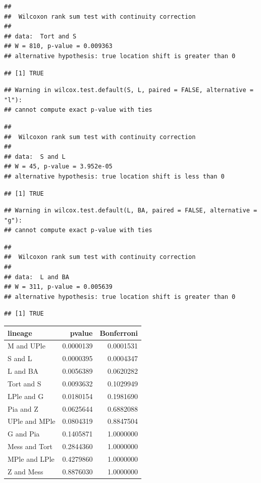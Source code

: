 \documentclass[]{article}
\begin{document}
\begin{verbatim}
## 
##  Wilcoxon rank sum test with continuity correction
## 
## data:  Tort and S
## W = 810, p-value = 0.009363
## alternative hypothesis: true location shift is greater than 0
\end{verbatim}

\begin{verbatim}
## [1] TRUE
\end{verbatim}

\begin{verbatim}
## Warning in wilcox.test.default(S, L, paired = FALSE, alternative = "l"):
## cannot compute exact p-value with ties
\end{verbatim}

\begin{verbatim}
## 
##  Wilcoxon rank sum test with continuity correction
## 
## data:  S and L
## W = 45, p-value = 3.952e-05
## alternative hypothesis: true location shift is less than 0
\end{verbatim}

\begin{verbatim}
## [1] TRUE
\end{verbatim}

\begin{verbatim}
## Warning in wilcox.test.default(L, BA, paired = FALSE, alternative = "g"):
## cannot compute exact p-value with ties
\end{verbatim}

\begin{verbatim}
## 
##  Wilcoxon rank sum test with continuity correction
## 
## data:  L and BA
## W = 311, p-value = 0.005639
## alternative hypothesis: true location shift is greater than 0
\end{verbatim}

\begin{verbatim}
## [1] TRUE
\end{verbatim}

\begin{longtable}[]{@{}lrr@{}}
\toprule
lineage & pvalue & Bonferroni\tabularnewline
\midrule
\endhead
M and UPle & 0.0000139 & 0.0001531\tabularnewline
S and L & 0.0000395 & 0.0004347\tabularnewline
L and BA & 0.0056389 & 0.0620282\tabularnewline
Tort and S & 0.0093632 & 0.1029949\tabularnewline
LPle and G & 0.0180154 & 0.1981690\tabularnewline
Pia and Z & 0.0625644 & 0.6882088\tabularnewline
UPle and MPle & 0.0804319 & 0.8847504\tabularnewline
G and Pia & 0.1405871 & 1.0000000\tabularnewline
Mess and Tort & 0.2844360 & 1.0000000\tabularnewline
MPle and LPle & 0.4279860 & 1.0000000\tabularnewline
Z and Mess & 0.8876030 & 1.0000000\tabularnewline
\bottomrule
\end{longtable}
\end{document}
